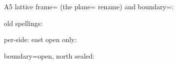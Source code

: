 \documentclass[varwidth=16cm, border=6pt]{standalone}
\begin{document}
\medskip
A5 lattice frame= (the plane= rename) and boundary=:
\begin{tenkzlattice}[rows=3, cols=4, frame=oblique, boundary=open]
\end{tenkzlattice}
\quad old spellings:
\begin{tenkzlattice}[rows=3, cols=4, frame=oblique, boundary legs]
\end{tenkzlattice}
\quad per-side: east open only:
\begin{tenkzlattice}[rows=3, cols=3, east=open]
\end{tenkzlattice}
\quad boundary=open, north sealed:
\begin{tenkzlattice}[rows=3, cols=3, boundary=open, north=none]
\end{tenkzlattice}
\end{document}
